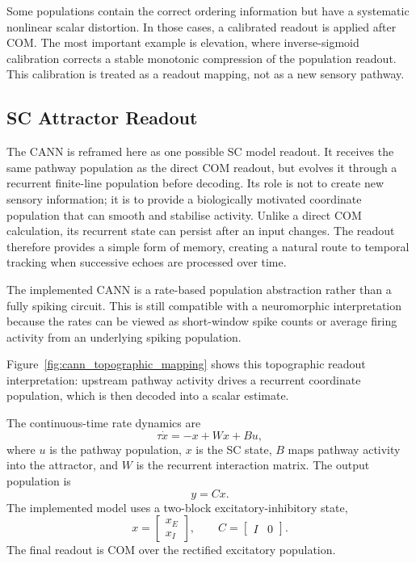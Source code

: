 Some populations contain the correct ordering information but have a systematic nonlinear scalar distortion. In those cases, a calibrated readout is applied after COM. The most important example is elevation, where inverse-sigmoid calibration corrects a stable monotonic compression of the population readout. This calibration is treated as a readout mapping, not as a new sensory pathway.

\subsection{SC Attractor Readout}

The CANN is reframed here as one possible SC model readout. It receives the same pathway population as the direct COM readout, but evolves it through a recurrent finite-line population before decoding. Its role is not to create new sensory information; it is to provide a biologically motivated coordinate population that can smooth and stabilise activity. Unlike a direct COM calculation, its recurrent state can persist after an input changes. The readout therefore provides a simple form of memory, creating a natural route to temporal tracking when successive echoes are processed over time.

The implemented CANN is a rate-based population abstraction rather than a fully spiking circuit. This is still compatible with a neuromorphic interpretation because the rates can be viewed as short-window spike counts or average firing activity from an underlying spiking population.



Figure~\ref{fig:cann_topographic_mapping} shows this topographic readout interpretation: upstream pathway activity drives a recurrent coordinate population, which is then decoded into a scalar estimate.

The continuous-time rate dynamics are
\begin{equation}
    \tau\dot{x} = -x + Wx + Bu,
\end{equation}
where $u$ is the pathway population, $x$ is the SC state, $B$ maps pathway activity into the attractor, and $W$ is the recurrent interaction matrix. The output population is
\begin{equation}
    y=Cx.
\end{equation}
The implemented model uses a two-block excitatory-inhibitory state,
\begin{equation}
    x=
    \begin{bmatrix}
        x_E\\
        x_I
    \end{bmatrix},
    \qquad
    C=\begin{bmatrix}I&0\end{bmatrix}.
\end{equation}
The final readout is COM over the rectified excitatory population.

